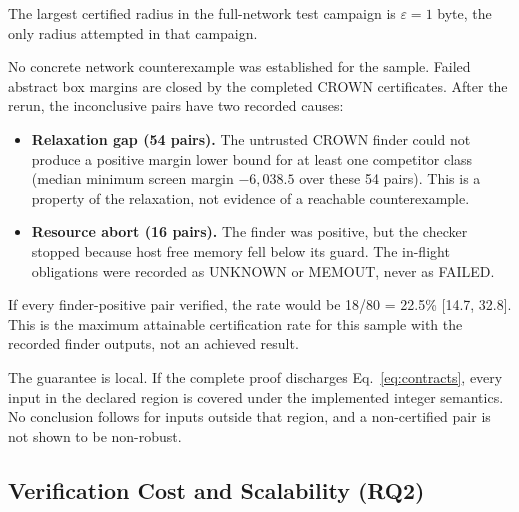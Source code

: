 The largest certified radius in the full-network test campaign is $\varepsilon = 1$ byte, the only radius attempted in that campaign.

No concrete network counterexample was established for the sample. Failed abstract box margins are closed by the completed CROWN certificates. After the rerun, the inconclusive pairs have two recorded causes:
\begin{itemize}
  \item \textbf{Relaxation gap (54 pairs).} The untrusted CROWN finder could not produce a positive margin lower bound for at least one competitor class (median minimum screen margin $-6{,}038.5$ over these 54 pairs). This is a property of the relaxation, not evidence of a reachable counterexample.
  \item \textbf{Resource abort (16 pairs).} The finder was positive, but the checker stopped because host free memory fell below its guard. The in-flight obligations were recorded as UNKNOWN or MEMOUT, never as FAILED.
\end{itemize}
If every finder-positive pair verified, the rate would be 18/80 = 22.5\% [14.7, 32.8]. This is the maximum attainable certification rate for this sample with the recorded finder outputs, not an achieved result.

The guarantee is local. If the complete proof discharges Eq.~\eqref{eq:contracts}, every input in the declared region is covered under the implemented integer semantics. No conclusion follows for inputs outside that region, and a non-certified pair is not shown to be non-robust.

\subsection{Verification Cost and Scalability (RQ2)}

